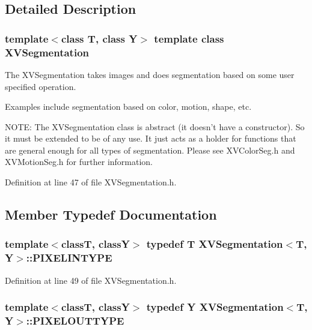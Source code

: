 \subsection{Detailed Description}
\subsubsection*{template$<$class T, class Y$>$  template class XVSegmentation}

The XVSegmentation takes images and does segmentation based on some user specified operation.

Examples include segmentation based on color, motion,  shape, etc.

NOTE: The XVSegmentation class is abstract (it doesn't have a constructor). So it must be extended to be of any use. It just acts as a holder for functions that are general enough for all types of segmentation. Please see XVColor\-Seg.h and XVMotion\-Seg.h for further information. 



Definition at line 47 of file XVSegmentation.h.

\subsection{Member Typedef Documentation}
\label{XVSegmentation_u0}
\hypertarget{class_XVSegmentation_u0}{
\subsubsection[PIXELINTYPE]{\setlength{\rightskip}{0pt plus 5cm}template$<$classT, classY$>$ typedef T XVSegmentation$<$T, Y$>$::PIXELINTYPE}}




Definition at line 49 of file XVSegmentation.h.\label{XVSegmentation_u1}
\hypertarget{class_XVSegmentation_u1}{
\subsubsection[PIXELOUTTYPE]{\setlength{\rightskip}{0pt plus 5cm}template$<$classT, classY$>$ typedef Y XVSegmentation$<$T, Y$>$::PIXELOUTTYPE}}




